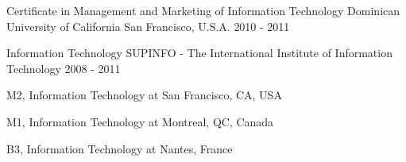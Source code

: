 \begin{cventries}
  \cventry
    {Certificate in Management and Marketing of Information Technology}
    {Dominican University of California}
    {San Francisco, U.S.A.}
    {2010 - 2011}
    {
      \begin{cvitems}
      \end{cvitems}
    }
    
  \cventry
    {Information Technology}
    {SUPINFO - The International Institute of Information Technology}
    {}
    {2008 - 2011}
    {
      \begin{cvitems}
        \item {M2, Information Technology at \hfill {\textcolor{awesome-red}{San Francisco, CA, USA}}}
        \item {M1, Information Technology at \hfill {\textcolor{awesome-red}{Montreal, QC, Canada}}}
        \item {B3, Information Technology at \hfill {\textcolor{awesome-red}{Nantes, France}}}
      \end{cvitems}
    }
\end{cventries}
